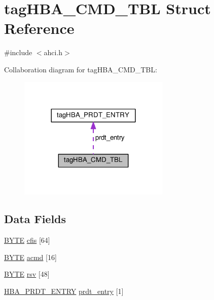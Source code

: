 \hypertarget{structtagHBA__CMD__TBL}{}\section{tag\+H\+B\+A\+\_\+\+C\+M\+D\+\_\+\+T\+BL Struct Reference}
\label{structtagHBA__CMD__TBL}


{\ttfamily \#include $<$ahci.\+h$>$}



Collaboration diagram for tag\+H\+B\+A\+\_\+\+C\+M\+D\+\_\+\+T\+BL\+:
\nopagebreak
\begin{figure}[H]
\begin{center}
\leavevmode
\includegraphics[width=204pt]{structtagHBA__CMD__TBL__coll__graph}
\end{center}
\end{figure}
\subsection*{Data Fields}
\begin{DoxyCompactItemize}
\item 
\hyperlink{ahci_8h_aae9749d96e15ccb4f482dd5f55d98f9b}{B\+Y\+TE} \hyperlink{structtagHBA__CMD__TBL_a3f54c56e56fb43a0c72e44f72717e53a}{cfis} \mbox{[}64\mbox{]}
\item 
\hyperlink{ahci_8h_aae9749d96e15ccb4f482dd5f55d98f9b}{B\+Y\+TE} \hyperlink{structtagHBA__CMD__TBL_a87421bf6801a2e75dd4d6e33c737857f}{acmd} \mbox{[}16\mbox{]}
\item 
\hyperlink{ahci_8h_aae9749d96e15ccb4f482dd5f55d98f9b}{B\+Y\+TE} \hyperlink{structtagHBA__CMD__TBL_a8d98e1762a624fbe9b7e510cf309046d}{rsv} \mbox{[}48\mbox{]}
\item 
\hyperlink{ahci_8h_a418c5f16923e451fc6fb5dde90dc5811}{H\+B\+A\+\_\+\+P\+R\+D\+T\+\_\+\+E\+N\+T\+RY} \hyperlink{structtagHBA__CMD__TBL_ac3a80d88e49b7bedf62d1a84217f1385}{prdt\+\_\+entry} \mbox{[}1\mbox{]}
\end{DoxyCompactItemize}


